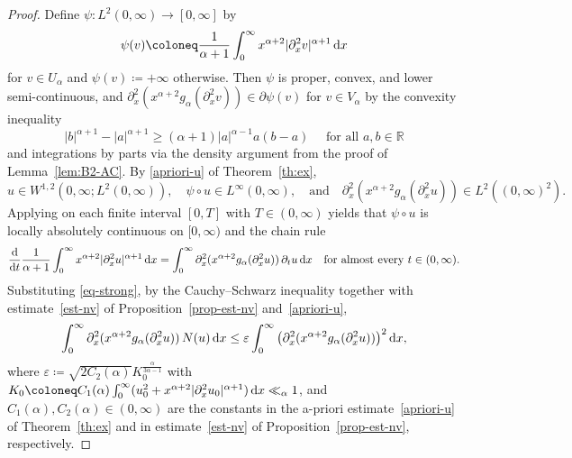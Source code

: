 \documentclass[reqno,12pt]{amsart}
\renewcommand{\d}{\ensuremath{\mathrm{d}}}
\newcommand{\R}{\ensuremath{\mathbb{R}}}
\newcommand{\eps}{\ensuremath{\varepsilon}}
\renewcommand{\d}{\ensuremath{{\rm d}}}
\numberwithin{equation}{section}
\begin{document}
%
\begin{proof}
Define
$\psi\colon L^2(0,\infty) \to [0,\infty]$
by
\[
\psi(v) \coloneq \frac{1}{\alpha+1}
\int_0^\infty x^{\alpha+2}
|\partial_x^2 v|^{\alpha+1}\,\d x
\]
for $v \in U_\alpha$ and
$\psi(v) \coloneq +\infty$ otherwise.
Then $\psi$ is proper, convex, and
lower semi-continuous, and
$\partial_x^2(x^{\alpha+2}
g_\alpha(\partial_x^2 v))
\in \partial \psi(v)$
for $v \in V_\alpha$
by the convexity inequality
\[
|b|^{\alpha+1} - |a|^{\alpha+1}
\ge (\alpha+1)|a|^{\alpha-1}a(b-a) \quad \text{ for all } a, b \in \R
\]
and integrations by parts via the
density argument from the proof of
Lemma~\ref{lem:B2-AC}.
By \eqref{apriori-u} of
Theorem~\ref{th:ex},
\begin{equation*}
    u \in W^{1,2}(0,\infty;L^2(0,\infty)), 
    \quad 
    \psi \circ u \in L^\infty(0,\infty), \quad \text{and} \quad \partial_x^2(x^{\alpha+2}
    g_\alpha(\partial_x^2 u))
    \in L^2((0,\infty)^2).
\end{equation*}
Applying \cite[Lemma~3.3]{brezis1973} on each finite interval $[0,T]$ with $T \in (0,\infty)$ yields that $\psi \circ u$ is locally absolutely continuous on $[0,\infty)$  and the chain rule 
%
\[
\frac{\d}{\d t} \frac{1}{\alpha+1}
\int_0^\infty x^{\alpha+2}
|\partial_x^2 u|^{\alpha+1}\,\d x
= \int_0^\infty
\partial_x^2(x^{\alpha+2}
g_\alpha(\partial_x^2 u))\,
\partial_t u\,\d x
\quad \text{for almost every } t \in (0,\infty).
\]
%
Substituting \eqref{eq-strong},
by the Cauchy--Schwarz inequality together with
estimate~\eqref{est-nv} of
Proposition~\ref{prop-est-nv}
and~\eqref{apriori-u},
%
\[
\int_0^\infty
\partial_x^2(x^{\alpha+2}
g_\alpha(\partial_x^2 u))\,
N(u)\,\d x
\le \eps \int_0^\infty
\big(\partial_x^2(x^{\alpha+2}
g_\alpha(\partial_x^2 u))\big)^2
\,\d x,
\]
%
where $\eps \coloneq \sqrt{2 C_2(\alpha)}
K_0^{\frac{\alpha}{3\alpha-1}}$
with
$K_0 \coloneq C_1(\alpha)
\int_0^\infty(u_0^2 + x^{\alpha+2}
|\partial_x^2 u_0|^{\alpha+1})\,\d x
\ll_\alpha 1$,
and $C_1(\alpha), C_2(\alpha) \in (0,\infty)$ are the constants in the
a-priori estimate~\eqref{apriori-u} of Theorem~\ref{th:ex} and in
estimate~\eqref{est-nv} of Proposition~\ref{prop-est-nv}, respectively.
\end{proof}
%
\end{document}
